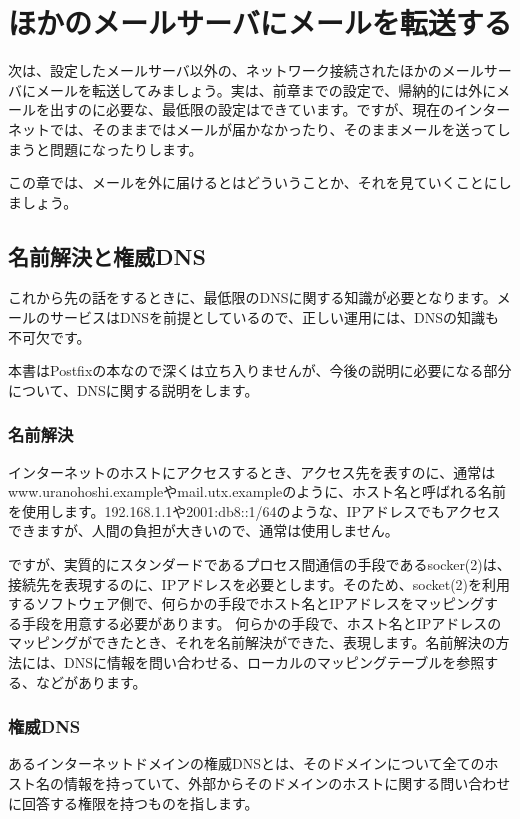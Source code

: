 \chapter{ほかのメールサーバにメールを転送する}

次は、設定したメールサーバ以外の、ネットワーク接続されたほかのメールサーバにメールを転送してみましょう。実は、前章までの設定で、帰納的には外にメールを出すのに必要な、最低限の設定はできています。ですが、現在のインターネットでは、そのままではメールが届かなかったり、そのままメールを送ってしまうと問題になったりします。

この章では、メールを外に届けるとはどういうことか、それを見ていくことにしましょう。

\section{名前解決と権威DNS}

これから先の話をするときに、最低限のDNSに関する知識が必要となります。メールのサービスはDNSを前提としているので、正しい運用には、DNSの知識も不可欠です。

本書はPostfixの本なので深くは立ち入りませんが、今後の説明に必要になる部分について、DNSに関する説明をします。

\subsection{名前解決}
インターネットのホストにアクセスするとき、アクセス先を表すのに、通常はwww.uranohoshi.exampleやmail.utx.exampleのように、ホスト名と呼ばれる名前を使用します。192.168.1.1や2001:db8::1/64のような、IPアドレスでもアクセスできますが、人間の負担が大きいので、通常は使用しません。

ですが、実質的にスタンダードであるプロセス間通信の手段であるsocker(2)は、接続先を表現するのに、IPアドレスを必要とします。そのため、socket(2)を利用するソフトウェア側で、何らかの手段でホスト名とIPアドレスをマッピングする手段を用意する必要があります。
何らかの手段で、ホスト名とIPアドレスのマッピングができたとき、それを名前解決ができた、表現します。名前解決の方法には、DNSに情報を問い合わせる、ローカルのマッピングテーブルを参照する、などがあります。

\subsection{権威DNS}
あるインターネットドメインの権威DNSとは、そのドメインについて全てのホスト名の情報を持っていて、外部からそのドメインのホストに関する問い合わせに回答する権限を持つものを指します。

